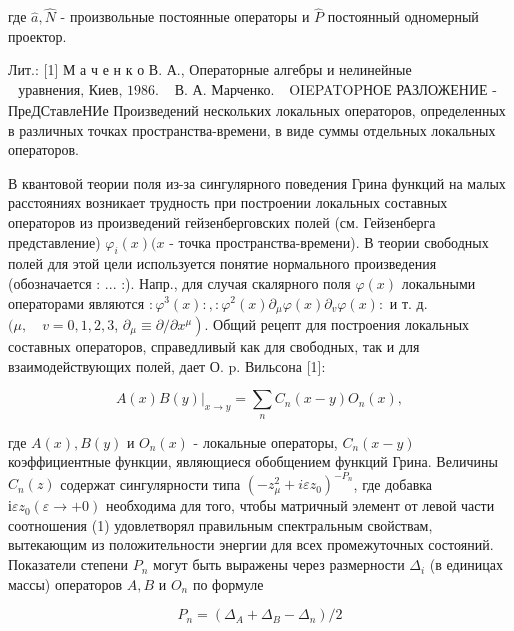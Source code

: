 \documentclass[10pt]{article}
\begin{document}
где $\hat{a}, \hat{N}$ - произвольные постоянные операторы и $\hat{P}$ постоянный одномерный проектор.



Лит.: [1] М а ч е н к о В. А., Операторные алгебры и нелинейные $\begin{array}{ll}\text { уравнения, Киев, } 1986 . & \text { В. А. Марченко. }\end{array}$ OIEPATOPНОЕ РАЗЛОЖЕНИЕ - ПреДСтавлеНИе Произведений нескольких локальных операторов, определенных в различных точках пространства-времени, в виде суммы отдельных локальных операторов.



В квантовой теории поля из-за сингулярного поведения Грина функций на малых расстояниях возникает трудность при построении локальных составных операторов из произведений гейзенберговских полей (см. Гейзенберга представление) $\varphi_{i}(x)(x$ - точка пространства-времени). В теории свободных полей для этой цели используется понятие нормального произведения (обозначается : ... :). Напр., для случая скалярного поля $\varphi(x)$ локальными операторами являются $: \varphi^{3}(x):,: \varphi^{2}(x) \partial_{\mu} \varphi(x) \partial_{v} \varphi(x):$ и т. д. $(\mu, \quad v=0,1,2,3$, $\left.\partial_{\mu} \equiv \partial / \partial x^{\mu}\right)$. Общий рецепт для построения локальных составных операторов, справедливый как для свободных, так и для взаимодействующих полей, дает О. p. Вильсона [1]:



\[

\left.A(x) B(y)\right|_{x \rightarrow y}=\sum_{n} C_{n}(x-y) O_{n}(x),

\]



где $A(x), B(y)$ и $O_{n}(x)$ - локальные операторы, $C_{n}(x-y)$ коэффициентные функции, являющиеся обобщением функций Грина. Величины $C_{n}(z)$ содержат сингулярности типа $\left(-z_{\mu}^{2}+i \varepsilon z_{0}\right)^{-P_{n}}$, где добавка $і \varepsilon z_{0}(\varepsilon \rightarrow+0)$ необходима для того, чтобы матричный элемент от левой части соотношения (1) удовлетворял правильным спектральным свойствам, вытекающим из положительности энергии для всех промежуточных состояний. Показатели степени $P_{n}$ могут быть выражены через размерности $\Delta_{i}$ (в единицах массы) операторов $A, B$ и $O_{n}$ по формуле



\[

P_{n}=\left(\Delta_{A}+\Delta_{B}-\Delta_{n}\right) / 2

\]
\end{document}
